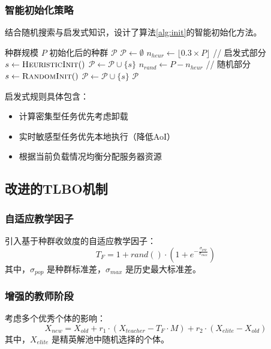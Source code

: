 \documentclass[conference]{IEEEtran}
\begin{document}
\subsubsection{智能初始化策略}
结合随机搜索与启发式知识，设计了算法\ref{alg:init}的智能初始化方法。

\begin{algorithm}[H]
  \caption{智能初始化策略}
  \label{alg:init}
  \begin{algorithmic}[1]
    \REQUIRE 种群规模 $P$
    \ENSURE 初始化后的种群 $\mathcal{P}$
    \STATE $\mathcal{P} \leftarrow \emptyset$
    \STATE $n_{heur} \leftarrow \lfloor 0.3 \times P \rfloor$ // 启发式部分
        \STATE $s \leftarrow \textsc{HeuristicInit}()$
        \STATE $\mathcal{P} \leftarrow \mathcal{P} \cup \{s\}$
    \ENDFOR
    \STATE $n_{rand} \leftarrow P - n_{heur}$ // 随机部分
        \STATE $s \leftarrow \textsc{RandomInit}()$
        \STATE $\mathcal{P} \leftarrow \mathcal{P} \cup \{s\}$
    \ENDFOR
    \RETURN $\mathcal{P}$
  \end{algorithmic}
\end{algorithm}

启发式规则具体包含：
\begin{itemize}
    \item 计算密集型任务优先考虑卸载
    \item 实时敏感型任务优先本地执行（降低AoI）
    \item 根据当前负载情况均衡分配服务器资源
\end{itemize}

\subsection{改进的TLBO机制}
\subsubsection{自适应教学因子}
引入基于种群收敛度的自适应教学因子\cite{b14}：
\begin{equation}
T_F = 1 + rand() \cdot \left(1 + e^{-\frac{\sigma_{pop}}{\sigma_{max}}}\right)
\end{equation}
其中，$\sigma_{pop}$ 是种群标准差，$\sigma_{max}$ 是历史最大标准差。

\subsubsection{增强的教师阶段}
考虑多个优秀个体的影响：
\begin{equation}
X_{new} = X_{old} + r_1 \cdot (X_{teacher} - T_F \cdot M) + r_2 \cdot (X_{elite} - X_{old})
\end{equation}
其中，$X_{elite}$ 是精英解池中随机选择的个体。
\end{document}
